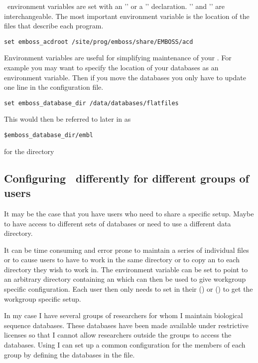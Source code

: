 \documentclass{report}
\begin{document}
\EMBOSS\ environment variables are set with an '' or a '' declaration. '' and '' are interchangeable.
The most important environment variable is the location of the  files that describe each program. 
\begin{verbatim}
set emboss_acdroot /site/prog/emboss/share/EMBOSS/acd
\end{verbatim}
Environment variables are useful for simplifying maintenance of your . For example you may want to specify the location of your databases as an environment variable. Then if you move the databases you only have to update one line in the configuration file.
\begin{verbatim}
set emboss_database_dir /data/databases/flatfiles
\end{verbatim}
This would then be referred to later in as
\begin{verbatim}
$emboss_database_dir/embl 
\end{verbatim}
for the directory  

\subsection{Configuring \EMBOSS\ differently for different groups of users}
It may be the case that you have users who need to share a specific setup. Maybe to have access to different sets of databases  or need to use a different data directory. 

It can be time consuming and error prone to maintain a series of individual  files or to cause users to have to work in the same directory or to copy an  to each directory they wish to work in. 
The environment variable  can be set to point to an arbitrary directory containing an   which can then be used to give workgroup specific configuration. Each user then only needs to set  in their  () or  () to get the workgroup specific setup.

In my case I have several groups of researchers for whom I maintain biological sequence databases. These databases have been made available under restrictive licenses so that I cannot allow researchers outside the groups to access the databases. Using  I can set up a common configuration for the members of each group by defining the databases in the  file.
\end{document}
